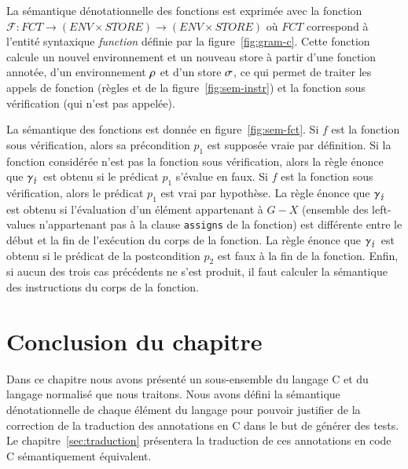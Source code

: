 


La sémantique dénotationnelle des fonctions est exprimée avec la fonction
$\mathcal{F} : FCT \rightarrow (ENV \times STORE) \rightarrow (ENV \times STORE)$ où $FCT$ correspond à
l'entité syntaxique \textit{function} définie par la figure~\ref{fig:gram-c}.
Cette fonction calcule un nouvel environnement et un nouveau store à partir
d'une fonction annotée, d'un environnement $\rho$ et d'un store $\sigma$, ce qui
permet de traiter les appels de fonction (règles  et
 de la figure~\ref{fig:sem-instr}) et la fonction sous
vérification (qui n'est pas appelée).

La sémantique des fonctions est donnée en figure~\ref{fig:sem-fct}.
Si $f$ est la fonction sous vérification, alors sa
précondition $p_1$ est supposée vraie par définition.
Si la fonction considérée n'est pas la fonction sous vérification, alors la
règle  énonce que $\gamma_\lightning$ est obtenu si le prédicat
$p_1$ s'évalue en faux.
Si $f$ est la fonction sous vérification, alors le prédicat
$p_1$ est vrai par hypothèse.
La règle  énonce que $\gamma_\lightning$ est obtenu si l'évaluation
d'un élément appartenant à $G-X$ (ensemble des left-values n'appartenant pas à
la clause \lstinline'assigns' de la fonction) est différente entre le début
et la fin de l'exécution du corps de la fonction.
La règle  énonce que $\gamma_\lightning$ est obtenu si le prédicat de la
postcondition $p_2$ est faux à la fin de la fonction.
Enfin, si aucun des trois cas précédents ne s'est produit, il faut calculer la
sémantique des instructions du corps de la fonction.


\section*{Conclusion du chapitre}

Dans ce chapitre nous avons présenté un sous-ensemble du langage C et du
langage \eacsl normalisé que nous traitons.
Nous avons défini la sémantique dénotationnelle de chaque élément du langage
pour pouvoir justifier de la correction de la traduction des annotations en C
dans le but de générer des tests.
Le chapitre~\ref{sec:traduction} présentera la traduction de ces annotations
\eacsl en code C sémantiquement équivalent.
